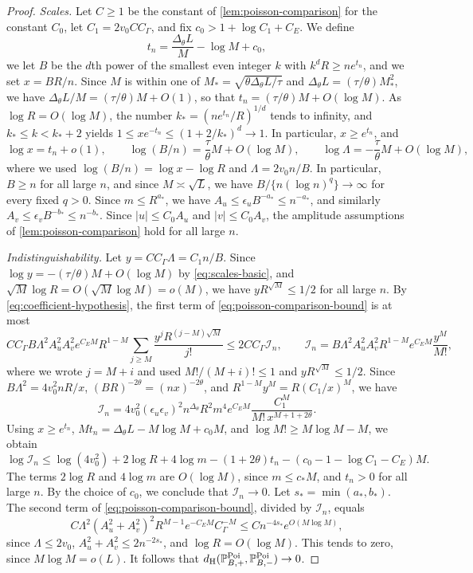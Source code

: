 \begin{proof}
\emph{Scales.} Let $C\ge1$ be the constant of
\cref{lem:poisson-comparison} for the constant $C_0$, let
$C_1=2v_0CC_\Gamma$, and fix $c_0>1+\log C_1+C_E$. We define
\[
 t_n=\frac{\Delta_\theta L}M-\log M+c_0,
\]
we let $B$ be the $d$th power of the smallest even integer $k$ with
$k^dR\ge ne^{t_n}$, and we set $x=BR/n$. Since $M$ is within one of
$M_*=\sqrt{\theta\Delta_\theta L/\tau}$ and
$\Delta_\theta L=(\tau/\theta)M_*^2$, we have
$\Delta_\theta L/M=(\tau/\theta)M+O(1)$, so that
$t_n=(\tau/\theta)M+O(\log M)$. As $\log R=O(\log M)$, the number
$k_*=(ne^{t_n}/R)^{1/d}$ tends to infinity, and $k_*\le k<k_*+2$
yields $1\le xe^{-t_n}\le(1+2/k_*)^d\to1$. In particular,
$x\ge e^{t_n}$, and
\begin{equation}\label{eq:scales-basic}
 \log x=t_n+o(1),\qquad
 \log(B/n)=\frac\tau\theta M+O(\log M),\qquad
 \log\Lambda=-\frac\tau\theta M+O(\log M),
\end{equation}
where we used $\log(B/n)=\log x-\log R$ and $\Lambda=2v_0n/B$. In
particular, $B\ge n$ for all large $n$, and since $M\asymp\sqrt L$, we
have $B/\{n(\log n)^q\}\to\infty$ for every fixed $q>0$. Since
$m\le R^{a_*}$, we have $A_u\le\epsilon_uB^{-a_*}\le n^{-a_*}$, and
similarly $A_v\le\epsilon_vB^{-b_*}\le n^{-b_*}$. Since $|u|\le C_0A_u$
and $|v|\le C_0A_v$, the amplitude assumptions of
\cref{lem:poisson-comparison} hold for all large $n$.

\emph{Indistinguishability.} Let $y=CC_\Gamma\Lambda=C_1n/B$. Since
$\log y=-(\tau/\theta)M+O(\log M)$ by \eqref{eq:scales-basic}, and
$\sqrt M\log R=O(\sqrt M\log M)=o(M)$, we have $yR^{\sqrt M}\le1/2$
for all large $n$. By \eqref{eq:coefficient-hypothesis}, the first term
of \eqref{eq:poisson-comparison-bound} is at most
\[
 CC_\Gamma B\Lambda^2A_u^2A_v^2e^{C_EM}R^{1-M}
 \sum_{j\ge M}\frac{y^jR^{(j-M)\sqrt M}}{j!}
 \le2CC_\Gamma\mathcal I_n,\qquad
 \mathcal I_n=B\Lambda^2A_u^2A_v^2R^{1-M}e^{C_EM}\frac{y^M}{M!},
\]
where we wrote $j=M+i$ and used $M!/(M+i)!\le1$ and
$yR^{\sqrt M}\le1/2$. Since $B\Lambda^2=4v_0^2nR/x$,
$(BR)^{-2\theta}=(nx)^{-2\theta}$, and $R^{1-M}y^M=R(C_1/x)^M$, we have
\[
 \mathcal I_n=4v_0^2(\epsilon_u\epsilon_v)^2n^{\Delta_\theta}R^2m^4
 e^{C_EM}\frac{C_1^M}{M!\,x^{M+1+2\theta}}.
\]
Using $x\ge e^{t_n}$,
$Mt_n=\Delta_\theta L-M\log M+c_0M$, and $\log M!\ge M\log M-M$, we
obtain
\[
 \log\mathcal I_n\le\log(4v_0^2)+2\log R+4\log m-(1+2\theta)t_n
 -(c_0-1-\log C_1-C_E)M.
\]
The terms $2\log R$ and $4\log m$ are $O(\log M)$, since
$m\le c_*M$, and $t_n>0$ for all large $n$. By the choice of $c_0$, we
conclude that $\mathcal I_n\to0$. Let $s_*=\min(a_*,b_*)$. The second
term of \eqref{eq:poisson-comparison-bound}, divided by $\mathcal I_n$,
equals
\[
 C\Lambda^2(A_u^2+A_v^2)^2R^{M-1}e^{-C_EM}C_\Gamma^{-M}
 \le Cn^{-4s_*}e^{O(M\log M)},
\]
since $\Lambda\le2v_0$, $A_u^2+A_v^2\le2n^{-2s_*}$, and
$\log R=O(\log M)$. This tends to zero, since $M\log M=o(L)$. It
follows that
$d_{\rm H}(\mathbb P^{\rm Poi}_{B,+},\mathbb P^{\rm Poi}_{B,-})\to0$.


\end{proof}
